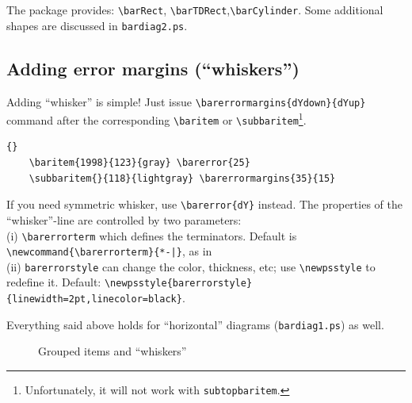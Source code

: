 \documentclass[12pt]{article}
\begin{document}
The package provides: \verb+\barRect+, \verb+\barTDRect+,\verb+\barCylinder+.
Some additional shapes are discussed in \texttt{bardiag2.ps}.

\subsection{Adding error margins (``whiskers'')}
Adding ``whisker'' is simple! Just issue 
\verb+\barerrormargins{dYdown}{dYup}+ command after
the corresponding
\verb+\baritem+ or \verb+\subbaritem+\footnote{Unfortunately, 
it will not work with \texttt{subtopbaritem}.}.
\begin{lstlisting}{}
    \baritem{1998}{123}{gray} \barerror{25}
    \subbaritem{}{118}{lightgray} \barerrormargins{35}{15}
\end{lstlisting}
%
If you need symmetric whisker, use \verb+\barerror{dY}+ instead.
The properties of the ``whisker''-line are controlled by two parameters:\\ 
(i) \verb+\barerrorterm+ which defines the terminators. Default is 
\verb+\newcommand{\barerrorterm}{*-|}+, as in \\
(ii) \verb+barerrorstyle+ can change the color, thickness, etc; use 
\verb+\newpsstyle+ to redefine it. Default: 
\verb+\newpsstyle{barerrorstyle}{linewidth=2pt,linecolor=black}+.

Everything said above holds for ``horizontal'' diagrams (\texttt{bardiag1.ps})
as well.

\begin{figure}[t]\centering
  \renewcommand{\placenumber}{\bottom}
  \renewcommand\numbercolor{\black\bf}
  
\caption{\label{fig:er} Grouped items and ``whiskers''}
\end{figure}

%
\end{document}

